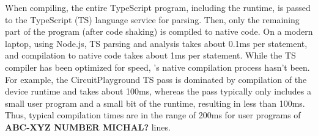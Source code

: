 When compiling, the entire TypeScript program, including the runtime, is
passed to the TypeScript (TS) language service for parsing. Then, only the remaining part of the program (after code shaking) is compiled to native code.
On a modern laptop, using Node.js, TS parsing and analysis takes about 0.1ms per statement, and \MC compilation to native code takes about 1ms per statement.
While the TS compiler has been optimized for speed, \MCN's native compilation process hasn't been. For example, the CircuitPlayground TS pass is dominated by compilation of the device runtime and takes about 100ms, whereas the \MC pass typically only includes a small user program and a small bit of the runtime, resulting in less than 100ms. Thus, typical compilation times are in the range of 200ms for user programs of \textbf{ABC-XYZ NUMBER MICHAL?} lines.






